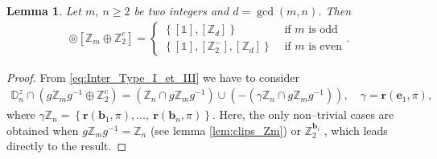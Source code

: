 \documentclass[11pt,a4paper]{amsart}
\newtheorem{lem}[thm]{Lemma}
\theoremstyle{definition}
\newcommand{\ZZ}{\mathbb{Z}}                %
\newcommand{\DD}{\mathbb{D}}                %
\newcommand{\1}{\mathds{1}}		            %
\newcommand{\vR}{\mathbf{r}}
\newcommand{\be}{\mathbf{e}}
\newcommand{\bb}{\mathbf{b}}
\newcommand{\set}[1]{\left\{#1\right\}}     %
\newcommand{\Dnz}{\DD_n^z}
\begin{document}
\begin{lem}\label{lem:DnvClipsZm}
  Let $m,\ n \geq 2$ be two integers and $d=\gcd(m,n)$. Then
  \begin{align*}
    [\Dnz] \circledcirc [\ZZ_m \oplus \ZZ_2^c]=
    \begin{cases}
      \set{[\1],[\ZZ_d]}             & \text{ if $m$ is odd}  \\
      \set{[\1],[\ZZ_{2}^-],[\ZZ_d]} & \text{ if $m$ is even}
    \end{cases}.
  \end{align*}
\end{lem}
\begin{proof}
  From \eqref{eq:Inter_Type_I_et_III} we have to consider
  \begin{align*}
    \Dnz \cap (g\ZZ_m g^{-1} \oplus \ZZ_2^c)=(\ZZ_n\cap g \ZZ_m g^{-1})\cup (-(\gamma\ZZ_n\cap g \ZZ_m g^{-1})),\quad \gamma=\vR(\be_1,\pi),
  \end{align*}
  where $\gamma \ZZ_n=\set{\vR(\bb_1,\pi),\dotsc,\ \vR(\bb_n,\pi)}$.
  Here, the only non--trivial cases are obtained when $g\ZZ_mg^{-1}=\ZZ_n$ (see lemma \ref{lem:clips_Zm}) or $\ZZ_2^{\bb_i}$ , which leads directly to the result.
\end{proof}
\end{document}
